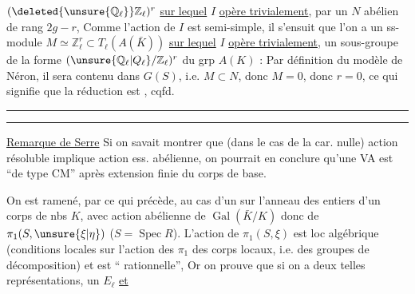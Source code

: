  $(\deleted{\unsure{\mathbb Q_\ell}}\mathbb Z_\ell)^r$ \uline{sur lequel} $I$ \uline{opère trivialement}, par un  $N$ abélien de rang $2g-r$,  Comme l'action de $I$ est semi-simple, il s'ensuit que l'on a un ss-module $M\simeq\mathbb Z_\ell^r\subset T_\ell(A(\bar K))$ \uline{sur lequel} $I$ \uline{opère trivialement},   un sous-groupe de la forme $(\unsure{\mathbb Q_\ell|Q_\ell}/\mathbb Z_\ell)^r$ du grp $A(K)$ : Par définition du modèle de Néron, il sera contenu dans $G(S)$, i.e. $M\subset N$, donc $M=0$, donc $r=0$, ce qui signifie que la réduction est , cqfd.

\par\noindent\rule{.45\linewidth}{.4pt}\par\noindent\rule{.42\linewidth}{.4pt}\par

\uline{Remarque de Serre} Si on savait montrer que (dans le cas de la car. nulle) action résoluble implique action ess. abélienne,  on pourrait en conclure qu'une  VA est ``de type CM'' après extension finie du corps de base.

On est ramené, par ce qui précède, au cas d'un   sur l'anneau des entiers  d'un corps de nbs $K$, avec action abélienne de $\operatorname{Gal}(\bar K/K)$ donc de $\pi_1(S,\unsure{\xi|\eta})$ ($S=\operatorname{Spec}R$). L'action de $\pi_1(S,\xi)$  est loc algébrique  (conditions locales sur l'action des $\pi_1$ des corps locaux, i.e. des groupes de décomposition) et est `` rationnelle'',   Or on prouve que si on a deux telles représentations,  un $E_\ell$ \uline{et}
